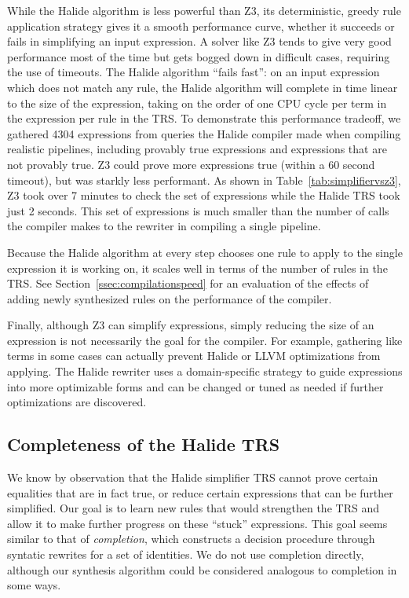 While the Halide algorithm is less powerful than Z3, its deterministic, greedy rule application strategy
gives it a smooth performance curve, whether it succeeds or fails in simplifying an input expression.
A solver like Z3 tends to give very good performance most of the time but gets bogged down in difficult cases, requiring the use of timeouts. The Halide algorithm ``fails fast'': on an input expression which does not match any rule,  the Halide algorithm will complete in time linear to the size of the expression, taking on the order of one CPU cycle per term in the expression per rule in the TRS. To demonstrate this performance tradeoff, we gathered 4304 expressions from queries the Halide compiler made when compiling realistic pipelines, including provably true expressions and expressions that are not provably true. Z3 could prove more expressions true (within a 60 second timeout), but was starkly less performant. As shown in Table~\ref{tab:simplifiervsz3}, Z3 took over 7 minutes to check the set of expressions while the Halide TRS took just 2 seconds. This set of expressions is much smaller than the number of calls the compiler makes to the rewriter in compiling a single pipeline.

Because the Halide algorithm at every step chooses one rule to apply to the single expression it is working on, it scales well in terms of the number of rules in the TRS. See Section~\ref{ssec:compilationspeed} for an evaluation of the effects of adding newly synthesized rules on the performance of the compiler. 

Finally, although Z3 can simplify expressions, simply reducing the size of an expression is not necessarily the goal for the compiler. For example, gathering like terms in some cases can actually prevent Halide or LLVM optimizations from applying. The Halide rewriter uses a domain-specific strategy to guide expressions into more optimizable forms and can be changed or tuned as needed if further optimizations are discovered. 

\subsection{Completeness of the Halide TRS}
\label{sec:completion}

We know by observation that the Halide simplifier TRS cannot prove certain equalities 
that are in fact true, or reduce certain expressions that can be further simplified. 
Our goal is to learn new rules that would strengthen the TRS and allow it to make
further progress on these ``stuck'' expressions. This goal seems similar to that of 
\emph{completion}, which constructs a decision procedure through syntatic rewrites
for a set of identities. We do not use completion directly, although
our synthesis algorithm could be considered analogous to completion in some ways.

